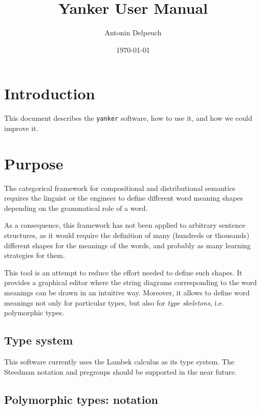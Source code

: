 \documentclass[a4paper]{article}
\title{Yanker User Manual}
\author{Antonin Delpeuch}
\date{\today}
\begin{document}
\maketitle

\section{Introduction}

This document describes the \texttt{yanker} software, how to use it, and how
we could improve it.

\section{Purpose}

The categorical framework for compositional and distributional semantics requires
the linguist or the engineer to define different word meaning shapes depending on
the grammatical role of a word.

As a consequence, this framework has not been applied to arbitrary sentence structures,
as it would require the definition of many (hundreds or thousands) different shapes for
the meanings of the words, and probably as many learning strategies for them.

This tool is an attempt to reduce the effort needed to define such shapes. It provides
a graphical editor where the string diagrams corresponding to the word meanings can
be drawn in an intuitive way. Moreover, it allows to define word meanings not only for
particular types, but also for \emph{type skeletons}, i.e. polymorphic types.

\subsection{Type system}

This software currently uses the Lambek calculus as its type system. The Steedman notation
and pregroups should be supported in the near future.

\subsection{Polymorphic types: notation}
\end{document}
